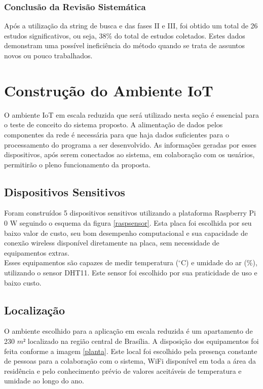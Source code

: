 \subsubsection{Conclusão da Revisão Sistemática}
\quad Após a utilização da string de busca e das fases II e III, foi obtido um total de 26 estudos significativos,
ou seja, 38\% do total de estudos coletados. Estes dados demonstram uma possível ineficiência do método quando se trata de assuntos
novos ou pouco trabalhados.

\section{Construção do Ambiente IoT}
\quad O ambiente \acrshort{IoT} em escala reduzida que será utilizado nesta seção é essencial para o teste de conceito
do sistema proposto. A alimentação de dados pelos componentes da rede é necessária para que haja
dados suficientes para o processamento do programa a ser desenvolvido. As informações geradas por esses dispositivos, após serem conectados ao sistema, em colaboração
com os usuários, permitirão o pleno funcionamento da proposta.
\subsection{Dispositivos Sensitivos}
\quad Foram construídos 5 dispositivos sensitivos utilizando a plataforma Raspberry Pi 0 W seguindo o esquema da figura \ref{raspsensor}. Esta placa
foi escolhida por seu baixo valor de custo, seu bom desempenho computacional e sua capacidade de conexão wireless disponível diretamente na placa, sem necessidade de equipamentos extras.
\\\null \quad Esses equipamentos são capazes de medir temperatura ($^\circ$C) e umidade do ar (\%), utilizando o sensor DHT11. Este sensor foi escolhido
por sua praticidade de uso e baixo custo.
\subsection{Localização}
\quad O ambiente escolhido para a aplicação em escala reduzida é um apartamento de 230 $m²$ localizado na região central de Brasília. A disposição dos equipamentos foi feita conforme a imagem \ref{planta}.
  Este local foi escolhido pela presença constante de pessoas para a colaboração com o sistema, WiFi disponível em toda a área da residência e pelo conhecimento prévio de valores aceitáveis de temperatura
  e umidade ao longo do ano.
  \pagebreak
{}
